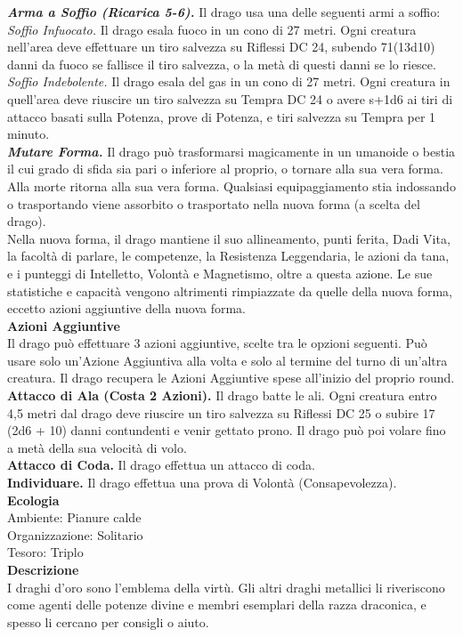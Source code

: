 \begin{multicols}{2}
\emph{\textbf{Arma a Soffio (Ricarica 5-6).}} Il drago usa una delle seguenti armi a soffio:\\
\emph{Soffio Infuocato.} Il drago esala fuoco in un cono di 27 metri. Ogni creatura nell'area deve effettuare un tiro salvezza su Riflessi DC 24, subendo 71(13d10) danni da fuoco se fallisce il tiro salvezza, o la metà di questi danni se lo riesce.\\

\emph{Soffio Indebolente.} Il drago esala del gas in un cono di 27 metri. Ogni creatura in quell'area deve riuscire un tiro salvezza su Tempra DC 24 o avere s+1d6 ai tiri di attacco basati sulla Potenza, prove di Potenza, e tiri salvezza su Tempra per 1 minuto.\\
\emph{\textbf{Mutare Forma.}} Il drago può trasformarsi magicamente in un umanoide o bestia il cui grado di sfida sia pari o inferiore al proprio, o tornare alla sua vera forma. Alla morte ritorna alla sua vera forma. Qualsiasi equipaggiamento stia indossando o trasportando viene assorbito o trasportato nella nuova forma (a scelta del drago).\\
Nella nuova forma, il drago mantiene il suo allineamento, punti ferita, Dadi Vita, la facoltà di parlare, le competenze, la Resistenza Leggendaria, le azioni da tana, e i punteggi di Intelletto, Volontà e Magnetismo, oltre a questa azione. Le sue statistiche e capacità vengono altrimenti rimpiazzate da quelle della nuova forma, eccetto azioni aggiuntive della nuova forma.\\
\textbf{Azioni Aggiuntive}\\
Il drago può effettuare 3 azioni aggiuntive, scelte tra le opzioni seguenti. Può usare solo un'Azione Aggiuntiva alla volta e solo al termine del turno di un'altra creatura. Il drago recupera le Azioni Aggiuntive spese all'inizio del proprio round.\\

\textbf{Attacco di Ala (Costa 2 Azioni).} Il drago batte le ali. Ogni creatura entro 4,5 metri dal drago deve riuscire un tiro salvezza su Riflessi DC 25 o subire 17 (2d6 + 10) danni contundenti e venir gettato prono. Il drago può poi volare fino a metà della sua velocità di volo.\\
\textbf{Attacco di Coda.} Il drago effettua un attacco di coda.\\
\textbf{Individuare.} Il drago effettua una prova di Volontà (Consapevolezza).\\
\textbf{Ecologia}\\
Ambiente: Pianure calde\\
Organizzazione: Solitario\\
Tesoro: Triplo\\
\textbf{Descrizione}\\
I draghi d'oro sono l'emblema della virtù. Gli altri draghi metallici li riveriscono come agenti delle potenze divine e membri esemplari della razza draconica, e spesso li cercano per consigli o aiuto.\\


\end{multicols}
